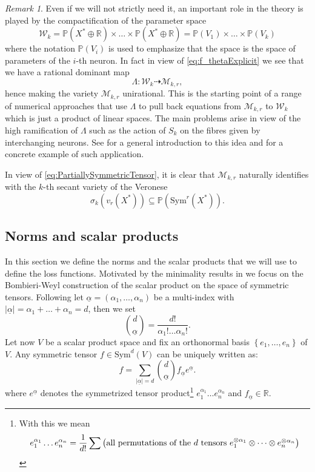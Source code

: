 \documentclass[11pt]{article}
\numberwithin{equation}{section}
\numberwithin{figure}{section}
\theoremstyle{plain}
\theoremstyle{definition}
\theoremstyle{remark}
\newtheorem{rem}[thm]{Remark}
\newcommand{\ot}{\otimes}
\newcommand{\op}{\oplus}
\newcommand{\su}{\subseteq}
\newcommand{\ga}{\alpha}
\newcommand{\R}{\mathbb{R}}
\renewcommand{\P}{\mathbb{P}}
\begin{document}
\begin{rem}
    Even if we will not strictly need it, an important role in the theory is played by the compactification of the parameter space
\[
\mathcal{W}_{k} = \P\left( X^{\ast} \op \R \right)\times\dots\times\P\left( X^{\ast} \op \R \right)
= \P\left( V_{1} \right)\times\dots\times\P\left( V_{k} \right)
\]
where the notation $\P\left( V_{i} \right)$ is used to emphasize that the space is the space of parameters of the $i$-th neuron. In fact in view of \eqref{eq:f_thetaExplicit} we see that we have a rational dominant map
\[
\Lambda:\mathcal{W}_{k}\dasharrow\mathcal{M}_{k,r},
\]
hence making the variety $\mathcal{M}_{k,r}$ unirational. This is the starting point of a range of numerical approaches that use $\Lambda$ to pull back equations from $\mathcal M _{k,r}$ to $\mathcal W _k$ which is just a product of linear spaces. The main problems arise in view of the high ramification of $\Lambda$ such as the action of $S_k$ on the fibres given by interchanging neurons. See \cite{DHOST} for a general introduction to this idea and \cite{BFHP25} for a concrete example of such application.
\end{rem}

In view of \eqref{eq:PartiallySymmetricTensor}, it is clear that $\mathcal{M}_{k,r}$ naturally identifies with the $k$-th secant variety of the Veronese
\begin{equation}
\sigma_{k}\left(v_{r}\left( X^{\ast} \right)\right)\su\P\left(\mathrm{Sym}^{r}\left( X^{\ast} \right)\right).
\end{equation}

\subsection{Norms and scalar products}\label{sec:norms}

In this section we define the norms and the scalar products that we
will use to define the loss functions. Motivated by the minimality results in \cite{KMQS25} we focus on the Bombieri-Weyl construction of the scalar product on the space of symmetric tensors. Following \cite[Chapter 6]{BFHP25}
let $\underline{\ga}=\left( \ga_{1},\dots,\ga_{n} \right)$ be a multi-index
with $\left| \underline{\ga} \right|=\ga_{1}+\dots+\ga_{n}=d$, then
we set
\[
\binom{d}{\underline{\ga}}
=
\frac{d!}{\ga_{1}!\dots\ga_{n}!}.
\]
Let now $V$ be a scalar product space and fix an orthonormal basis
$\left\{ e_{1},\dots,e_{n} \right\}$ of $V$. Any symmetric tensor
$f\in\mathrm{Sym}^{d}\left( V \right)$ can be uniquely written as:
\[
f
=
\sum_{\left| \underline{\alpha} \right|=d}
\binom{d}{\underline{\alpha}}
f_{\underline{\alpha}}
e^{\underline{\alpha}}.
\]
where $e^{\underline{\alpha}}$ denotes the symmetrized tensor product\footnote{With this we mean 
\[
e_{1}^{\alpha_{1}}\dots e_{n}^{\alpha_{n}} = \frac{1}{d!} \sum \left( \mbox{all permutations of the \ensuremath{d} tensors
\ensuremath{e_{1}^{\ot\ga_{1}}\ot\dots\ot e_{n}^{\ot\ga_{n}}}}
\right)
\]
}
$e_{1}^{\alpha_{1}}\dots e_{n}^{\alpha_{n}}$ and
$f_{\underline{\alpha}}\in\mathbb{R}$.
\end{document}
